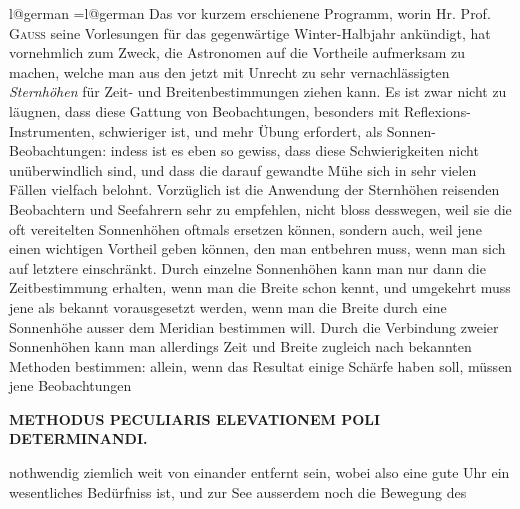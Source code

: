\clearpage
{}%
\vspace*{.055\textheight}
\noindent{}\par
\bigskip
\begingroup
\ifcsname l@german\endcsname
  \language=\csname l@german\endcsname\relax
   
\fi
Das vor kurzem erschienene Programm, worin Hr. Prof. \textsc{Gauss} seine Vorlesungen
für das gegenwärtige Winter-Halbjahr ankündigt, hat vornehmlich zum
Zweck, die Astronomen auf die Vortheile aufmerksam zu machen, welche man
aus den jetzt mit Unrecht zu sehr vernachlässigten \textit{Sternhöhen} für Zeit- und Breitenbestimmungen
ziehen kann. Es ist zwar nicht zu läugnen, dass diese Gattung
von Beobachtungen, besonders mit Reflexions-Instrumenten, schwieriger
ist, und mehr Übung erfordert, als Sonnen-Beobachtungen: indess ist es eben
so gewiss, dass diese Schwierigkeiten nicht unüberwindlich sind, und dass die
darauf gewandte Mühe sich in sehr vielen Fällen vielfach belohnt. Vorzüglich
ist die Anwendung der Sternhöhen reisenden Beobachtern und Seefahrern sehr
zu empfehlen, nicht bloss desswegen, weil sie die oft vereitelten Sonnenhöhen
oftmals ersetzen können, sondern auch, weil jene einen wichtigen Vortheil geben
können, den man entbehren muss, wenn man sich auf letztere einschränkt.
Durch einzelne Sonnenhöhen kann man nur dann die Zeitbestimmung erhalten,
wenn man die Breite schon kennt, und umgekehrt muss jene als bekannt vorausgesetzt
werden, wenn man die Breite durch eine Sonnenhöhe ausser dem
Meridian bestimmen will. Durch die Verbindung zweier Sonnenhöhen kann
man allerdings Zeit und Breite zugleich nach bekannten Methoden bestimmen:
allein, wenn das Resultat einige Schärfe haben soll, müssen jene Beobachtungen
\par\clearpage
\endgroup
\noindent{}%
\makebox[12mm][l]{}%
\parbox[t]{\dimexpr\linewidth-24mm\relax}{\centering\fontsize{7.4}{9.2}\selectfont\bfseries METHODUS PECULIARIS ELEVATIONEM POLI DETERMINANDI.\par}%
\par\nobreak\smallskip
\noindent nothwendig ziemlich weit von einander entfernt sein, wobei also eine gute Uhr
ein wesentliches Bedürfniss ist, und zur See ausserdem noch die Bewegung des
